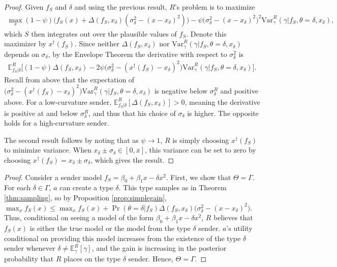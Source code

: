 \documentclass[11pt,dvipsnames]{article}
\newcommand{\Var}{\mathrm{Var}}
\begin{document}
\begin{appendix}
\forecast*
\begin{proof}
Given $f_S$ and $\delta$ and using the previous result, $R$'s problem is to maximize
\begin{align*}
\max_x (1-\psi)\big(f_S(x) + \Delta(f_S,x_\delta)(\sigma_\delta^2-(x-x_\delta)^2)\big) -\psi\big(\sigma_\delta^2-(x-x_\delta)^2\big)^2\Var_\gamma^R(\gamma|f_S,\theta=\delta,x_\delta),
\end{align*}
which $S$ then integrates out over the plausible values of $f_S$.
Denote this maximizer by $x^\dag(f_S)$.
Since neither $\Delta(f_S,x_\delta)$ nor $\Var_\gamma^R(\gamma|f_S,\theta=\delta,x_\delta)$ depends on $\sigma_\delta$, by the Envelope Theorem the derivative with respect to $\sigma_\delta^2$ is
\begin{align*}
\mathbb{E}_{f_S|\delta}^R\big[(1-\psi)\Delta(f_S,x_\delta)-2\psi\big(\sigma_\delta^2-(x^\dag(f_S)-x_\delta)^2\big)\Var_\gamma^R(\gamma|f_S,\theta=\delta,x_\delta)\big].
\end{align*}
Recall from above that the expectation of $\big(\sigma_\delta^2-(x^\dag(f_S)-x_\delta)^2\big)\Var_\gamma^R(\gamma|f_S,\theta=\delta,x_\delta)$ is negative below $\sigma_\delta^R$ and positive above.
For a low-curvature sender, $\mathbb{E}_{f_S|\delta}^R[\Delta(f_S,x_\delta)]>0$, meaning the derivative is positive at and below $\sigma_\delta^R$, and thus that his choice of $\sigma_\delta$ is higher.
The opposite holds for a high-curvature sender.

The second result follows by noting that as $\psi\to 1$, $R$ is simply choosing $x^\dag(f_S)$ to minimize variance.
When $x_\delta\pm\sigma_\delta\in[0,\overline{x}]$, this variance can be set to zero by choosing $x^\dag(f_S) = x_\delta\pm \sigma_\delta$, which gives the result.
\end{proof}

\optimaltype*
\begin{proof}
Consider a sender model $f_S = \beta_0+\beta_1 x - \delta x^2$.
First, we show that $\Theta = \Gamma$.
For each $\delta \in \Gamma$, $a$ can create a type $\delta$.
This type samples as in Theorem \ref{thm:sampling}, so by Proposition \ref{prop:simplegain}, $\max_x f_S(x) \leq \max_x f_S(x) + \Pr(\theta=\delta|f_S)\Delta(f_S,x_\delta)\big(\sigma_\delta^2-(x-x_\delta)^2\big)$.
Thus, conditional on seeing a model of the form $\beta_0+\beta_1x-\delta x^2$, $R$ believes that $f_S(x)$ is either the true model or the model from the type $\delta$ sender.
$a$'s utility conditional on providing this model increases from the existence of the type $\delta$ sender whenever $\delta \neq \mathbb{E}_\gamma^R[\gamma]$, and the gain is increasing in the posterior probability that $R$ places on the type $\delta$ sender.
Hence, $\Theta = \Gamma$.


\end{proof}
\end{appendix}
\end{document}
